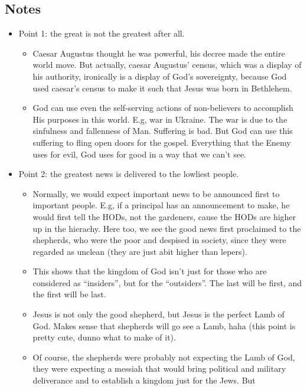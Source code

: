 \subsection*{Notes}
\begin{itemize}
  \item{Point 1: the great is not the greatest after all.
  \begin{itemize}
    \item{Caesar Augustus thought he was powerful, his decree made the entire
    world move.  But actually, caesar Augustus’ census, which was a display
    of his authority, ironically is a display of God’s sovereignty, because
    God used caesar’s census to make it such that Jesus was born in
    Bethlehem.}
    \item{God can use even the self-serving actions of non-believers to
    accomplish His purposes in this world.  E.g, war in Ukraine.  The war is
    due to the sinfulness and fallenness of Man.  Suffering is bad.  But God
    can use this suffering to fling open doors for the gospel.  Everything
    that the Enemy uses for evil, God uses for good in a way that we can’t
    see.}
  \end{itemize}}
  \item{Point 2: the greatest news is delivered to the lowliest people.
  \begin{itemize}
    \item{Normally, we would expect important news to be announced first to
    important people.  E.g, if a principal has an announcement to make, he
    would first tell the HODs, not the gardeners, cause the HODs are higher
    up in the hierachy.  Here too, we see the good news first proclaimed to
    the shepherds, who were the poor and despised in society, since they were
    regarded as unclean (they are just abit higher than lepers).}
    \item{This shows that the kingdom of God isn’t just for those who are considered as “insiders”, but for the “outsiders”. The last will be first, and the first will be last.}
    \item{Jesus is not only the good shepherd, but Jesus is the perfect Lamb
    of God.  Makes sense that shepherds will go see a Lamb, haha (this point is pretty cute, dunno what to make of it).}
    \item{Of course, the shepherds were probably not expecting the Lamb of
    God, they were expecting a messiah that would bring political and
    military deliverance and to establish a kingdom just for the Jews.  But
}
\end{itemize}}
\end{itemize}
